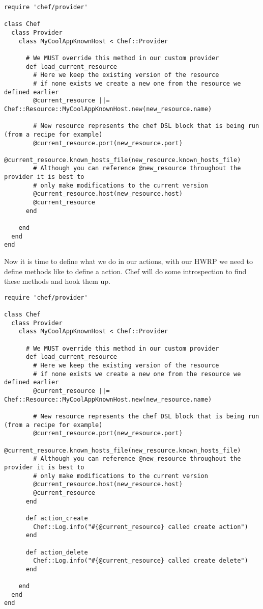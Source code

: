 \begin{lstlisting}[label=lst:cookbook-hwrp4]
require 'chef/provider'

class Chef
  class Provider
    class MyCoolAppKnownHost < Chef::Provider

      # We MUST override this method in our custom provider
      def load_current_resource
        # Here we keep the existing version of the resource
        # if none exists we create a new one from the resource we defined earlier
        @current_resource ||= Chef::Resource::MyCoolAppKnownHost.new(new_resource.name)

        # New resource represents the chef DSL block that is being run (from a recipe for example)
        @current_resource.port(new_resource.port)
        @current_resource.known_hosts_file(new_resource.known_hosts_file)
        # Although you can reference @new_resource throughout the provider it is best to
        # only make modifications to the current version
        @current_resource.host(new_resource.host)
        @current_resource
      end

    end
  end
end
\end{lstlisting}

Now it is time to define what we do in our actions, with our HWRP we need to define methods like  to define a  action. Chef will do some introspection to find these methods and hook them up.

\begin{lstlisting}[label=lst:cookbook-hwrp5]
require 'chef/provider'

class Chef
  class Provider
    class MyCoolAppKnownHost < Chef::Provider

      # We MUST override this method in our custom provider
      def load_current_resource
        # Here we keep the existing version of the resource
        # if none exists we create a new one from the resource we defined earlier
        @current_resource ||= Chef::Resource::MyCoolAppKnownHost.new(new_resource.name)

        # New resource represents the chef DSL block that is being run (from a recipe for example)
        @current_resource.port(new_resource.port)
        @current_resource.known_hosts_file(new_resource.known_hosts_file)
        # Although you can reference @new_resource throughout the provider it is best to
        # only make modifications to the current version
        @current_resource.host(new_resource.host)
        @current_resource
      end

      def action_create
        Chef::Log.info("#{@current_resource} called create action")
      end

      def action_delete
        Chef::Log.info("#{@current_resource} called create delete")
      end

    end
  end
end
\end{lstlisting}

